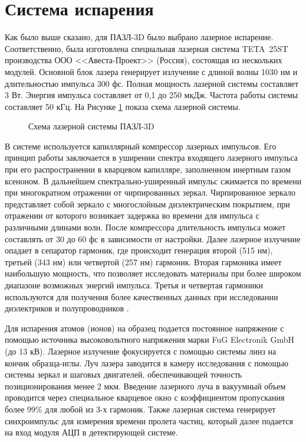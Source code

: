 \section{Система испарения}\label{sec:ch2/sec3}

Как было выше сказано, для ПАЗЛ-3D было выбрано лазерное испарение. Соответственно, была изготовлена специальная лазерная система TETA~25ST производства ООО <<Авеста-Проект>> (Россия), состоящая из нескольких модулей. Основной блок лазера генерирует излучение с длиной волны 1030 нм и длительностью импульса 300 фс. Полная мощность лазерной системы составляет 3 Вт. Энергия импульса составляет от 0,1 до 250 мкДж. Частота работы системы составляет 50 кГц. На Рисунке \cref{fig:APPLE_lasersystem} показа схема лазерной системы.

\begin{figure}[htb]
	\caption{Схема лазерной системы ПАЗЛ-3D}
	\label{fig:APPLE_lasersystem}
\end{figure}

В системе используется капиллярный компрессор лазерных импульсов. Его принцип работы заключается в уширении спектра входящего лазерного импульса при его распространении в кварцевом капилляре, заполненном инертным газом ксеноном. В дальнейшем спектрально-уширенный импульс сжимается по времени при многократном отражении от чирпированных зеркал. Чирпированное зеркало представляет собой зеркало с многослойным диэлектрическим покрытием, при отражении от которого возникает задержка во времени для импульса с различными длинами волн. После компрессора длительность импульса может составлять от 30 до 60 фс в зависимости от настройки. Далее лазерное излучение опадает в сепаратор гармоник, где происходит генерация второй (515 нм), третьей (343 нм) или четвертой (257 нм) гармоник. Вторая гармоника имеет наибольшую мощность, что позволяет исследовать материалы при более широком диапазоне возможных энергий импульса. Третья и четвертая гармоники используются для получения более качественных данных при исследовании диэлектриков и полупроводников \cite{Gault06}.

Для испарения атомов (ионов) на образец подается постоянное напряжение с помощью источника высоковольтного напряжения марки FuG Electronik GmbH (до 13 кВ). Лазерное излучение фокусируется с помощью системы линз на кончик образца-иглы. Луч лазера заводится в камеру исследования с помощью системы зеркал и шаговых двигателей, обеспечивающей точность позиционирования менее 2 мкм. Введение лазерного луча в вакуумный объем проводится через специальное кварцевое окно с коэффициентом пропускания более 99\% для любой из 3-х гармоник. Также лазерная система генерирует синхроимпульс для измерения времени пролета частиц, который далее подается на вход модуля АЦП в детектирующей системе.



